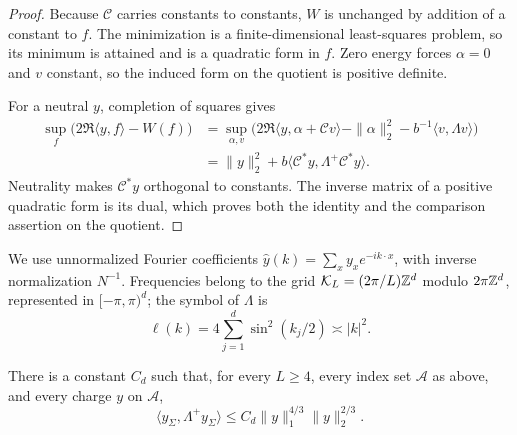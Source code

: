 \begin{proof}
Because $\mathcal C$ carries constants to constants, $W$ is unchanged by
addition of a constant to $f$.  The minimization is a finite-dimensional
least-squares problem, so its minimum is attained and is a quadratic
form in $f$.  Zero energy forces $\alpha=0$ and $v$
constant, so the induced form on the quotient is positive definite.

For a neutral $y$, completion of squares gives
\[
\begin{split}
 \sup_f\bigl(2\Re\langle y,f\rangle-W(f)\bigr)
 &=\sup_{\alpha,v}\bigl(
       2\Re\langle y,\alpha+\mathcal Cv\rangle
       -\|\alpha\|_2^2-b^{-1}\langle v,\Lambda v\rangle\bigr)\\
 &=\|y\|_2^2+b\langle\mathcal C^*y,
                         \Lambda^+\mathcal C^*y\rangle.
\end{split}
\]
Neutrality makes $\mathcal C^*y$ orthogonal to constants.  The inverse
matrix of a positive quadratic form is its dual, which proves both the
identity and the comparison assertion on the quotient.
\end{proof}

We use unnormalized Fourier coefficients
$\widehat y(k)=\sum_x y_xe^{-ik\cdot x}$, with inverse normalization
$N^{-1}$.  Frequencies belong to the grid
$\mathcal K_L=(2\pi/L)\mathbb Z^d$ modulo $2\pi\mathbb Z^d$, represented in
$[-\pi,\pi)^d$; the symbol of
$\Lambda$ is
\begin{equation}\label{eq:initial-laplacian-symbol}
 \ell(k)=4\sum_{j=1}^d\sin^2(k_j/2)\asymp |k|^2.
\end{equation}

\begin{lemma}
\label{lem:fourier-charge}
There is a constant $C_d$ such that, for every $L\ge4$, every index
set $\mathcal A$ as above, and every charge $y$ on $\mathcal A$,
\[
 \langle y_\Sigma,\Lambda^+y_\Sigma\rangle
 \le C_d\|y\|_1^{4/3}\|y\|_2^{2/3}.
\]
\end{lemma}

